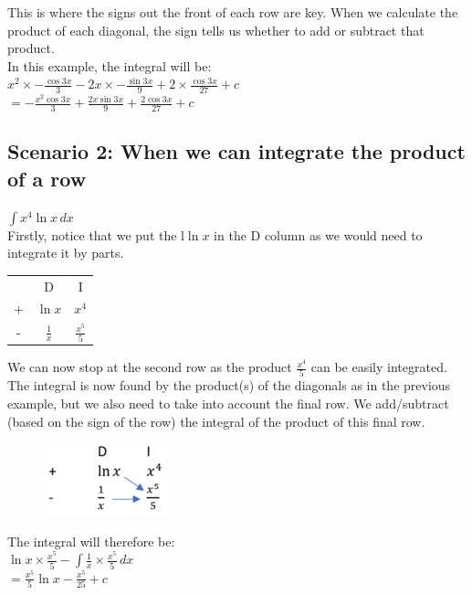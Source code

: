 \documentclass[../main.tex]{subfiles}
\begin{document}
This is where the signs out the front of each row are key. When we calculate the product of each diagonal, the sign tells us whether to add or subtract that product.\\

In this example, the integral will be:\\
\(x^2 \times -\frac{\cos{3x}}{3}-2x\times -\frac{\sin{3x}}{9}+2\times \frac{\cos{3x}}{27}+c\)\\

\(=-\frac{x^2\cos{3x}}{3}+\frac{2x\sin{3x}}{9}+\frac{2\cos{3x}}{27}+c\)\\

\subsection*{Scenario 2: When we can integrate the product of a row}
\(\int x^4 \ln{x}\, dx\)\\
Firstly, notice that we put the l\(\ln{x}\) in the D column as we would need to integrate it by parts.\\
\begin{tabular}{ c c c }
   & D & I \\ 
 +  & $\ln{x}$ &$x^4$ \\  
 - & $\frac{1}{x}$ & $\frac{x^5}{5}$\\
\end{tabular}

We can now stop at the second row as the product \(\frac{x^4}{5}\) can be easily integrated.\\ 

The integral is now found by the product(s) of the diagonals as in the previous example, but we also need to take into account the final row. We add/subtract (based on the sign of the row) the integral of the product of this final row.
\begin{figure}[h]
    \includegraphics{images/dimethod2.png}
\end{figure}

The integral will therefore be:\\
\(\ln{x} \times \frac{x^5}{5}-\int \frac{1}{x}\times \frac{x^5}{5}\, dx\)\\
\(=\frac{x^5}{5}\ln{x}-\frac{x^5}{25}+c\)\\
\end{document}
